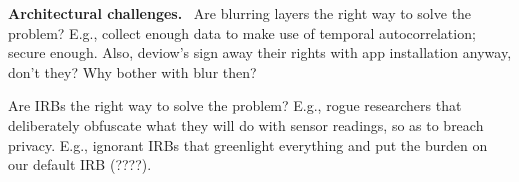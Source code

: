 \textbf{Architectural challenges.}~
Are blurring layers the right way to solve the problem? E.g., 
collect enough data to make use of temporal autocorrelation; secure enough.
Also, deviow's sign away their rights with app installation anyway, 
don't they? Why bother with blur then?

Are IRBs the right way to solve the problem? E.g., 
rogue researchers that deliberately obfuscate what they will 
do with sensor readings, so as to breach privacy. E.g., 
ignorant IRBs that greenlight everything and put the burden on 
our default IRB (????).

